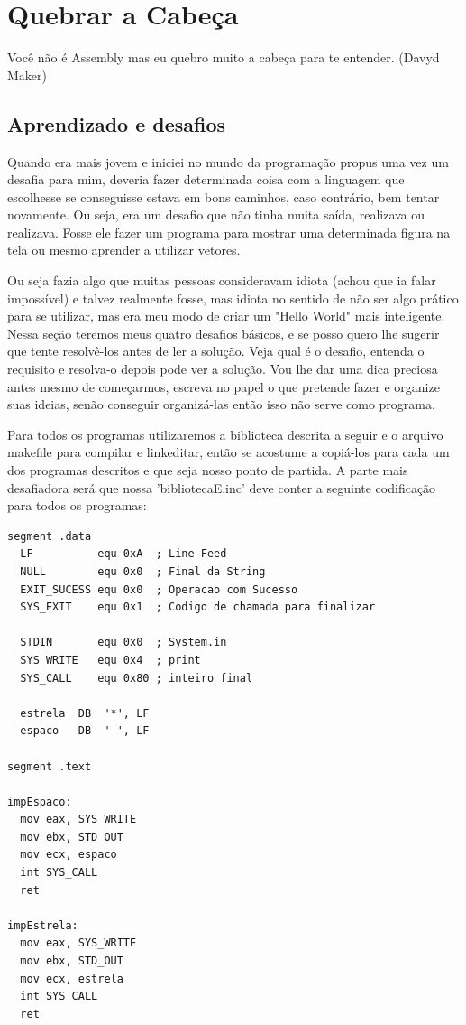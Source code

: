 \chapter{Quebrar a Cabeça}

\begin{remark}
	Você não é Assembly mas eu quebro muito a cabeça para te entender. (Davyd Maker) 
\end{remark}

\section{Aprendizado e desafios}
Quando era mais jovem e iniciei no mundo da programação propus uma vez um desafia para mim, deveria fazer determinada coisa com a linguagem que escolhesse se conseguisse estava em bons caminhos, caso contrário, bem tentar novamente. Ou seja, era um desafio que não tinha muita saída, realizava ou realizava. Fosse ele fazer um programa para mostrar uma determinada figura na tela ou mesmo aprender a utilizar vetores. 

Ou seja fazia algo que muitas pessoas consideravam idiota (achou que ia falar impossível) e talvez realmente fosse, mas idiota no sentido de não ser algo prático para se utilizar, mas era meu modo de criar um "Hello World" mais inteligente. Nessa seção teremos meus quatro desafios básicos, e se posso quero lhe sugerir que tente resolvê-los antes de ler a solução. Veja qual é o desafio, entenda o requisito e resolva-o depois pode ver a solução. Vou lhe dar uma dica preciosa antes mesmo de começarmos, escreva no papel o que pretende fazer e organize suas ideias, senão conseguir organizá-las então isso não serve como programa.

Para todos os programas utilizaremos a biblioteca descrita a seguir e o arquivo makefile para compilar e linkeditar, então se acostume a copiá-los para cada um dos programas descritos e que seja nosso ponto de partida. 
A parte mais desafiadora será que nossa 'bibliotecaE.inc' deve conter a seguinte codificação para todos os programas:

\begin{lstlisting}[]
segment .data
  LF          equ 0xA  ; Line Feed
  NULL        equ 0x0  ; Final da String
  EXIT_SUCESS equ 0x0  ; Operacao com Sucesso
  SYS_EXIT    equ 0x1  ; Codigo de chamada para finalizar

  STDIN       equ 0x0  ; System.in
  SYS_WRITE   equ 0x4  ; print
  SYS_CALL    equ 0x80 ; inteiro final

  estrela  DB  '*', LF
  espaco   DB  ' ', LF

segment .text

impEspaco:
  mov eax, SYS_WRITE
  mov ebx, STD_OUT
  mov ecx, espaco
  int SYS_CALL
  ret

impEstrela:
  mov eax, SYS_WRITE
  mov ebx, STD_OUT
  mov ecx, estrela
  int SYS_CALL
  ret  
\end{lstlisting}

